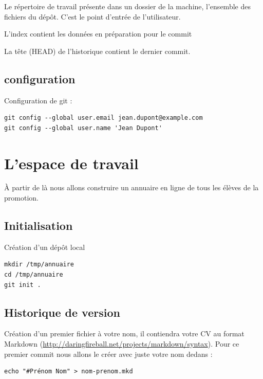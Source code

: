\documentclass[a4paper]{article}
\begin{document}
Le répertoire de travail présente dans un dossier de la machine, l'ensemble des fichiers du dépôt. C'est le point d'entrée de l'utilisateur.

L'index contient les données en préparation pour le commit

La tête (HEAD) de l'historique contient le dernier commit.


\subsection*{configuration}

Configuration de git :

\begin{verbatim}
git config --global user.email jean.dupont@example.com 
git config --global user.name 'Jean Dupont'
\end{verbatim}

\section*{L'espace de travail}

À partir de là nous allons construire un annuaire en ligne de tous les élèves de la promotion. 

\subsection*{Initialisation}
Création d'un dépôt local
\begin{verbatim}
mkdir /tmp/annuaire
cd /tmp/annuaire
git init .
\end{verbatim}

\subsection*{Historique de version}
Création d'un premier fichier à votre nom, il contiendra votre CV au format Markdown (\url{http://daringfireball.net/projects/markdown/syntax}).
Pour ce premier commit nous allons le créer avec juste votre nom dedans :
\begin{verbatim}
echo "#Prénom Nom" > nom-prenom.mkd
\end{verbatim}
\end{document}
